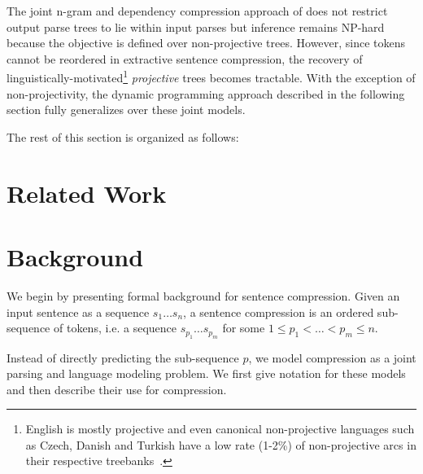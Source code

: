 \documentclass[11pt,a4paper]{article}
\begin{document}
The joint n-gram and dependency compression approach of
 does not restrict output parse trees to lie
within input parses but inference remains NP-hard~\cite{thadani14}
because the objective is defined over non-projective trees.
However, since tokens cannot be reordered in extractive sentence
compression, the recovery of linguistically-motivated\footnote{English
    is mostly projective and even
    canonical non-projective languages such
    as Czech, Danish and Turkish have a low rate (1-2\%) of
    non-projective arcs in their respective treebanks~\cite{nivre05}.}
\emph{projective} trees becomes tractable. With the exception of
non-projectivity, the dynamic programming approach described in
the following section fully generalizes over these joint models.

The rest of this section is organized as follows:



\section{Related Work}


\cite{eisner99dp}

\cite{huang2005machine}

\section{Background}
We begin by presenting formal background for sentence compression. Given an input sentence as a sequence $s_1 \ldots s_n$, a sentence compression is an ordered sub-sequence of tokens, i.e. a sequence $s_{p_1} \ldots s_{p_m}$ for some
$1 \leq p_1 < \ldots < p_m \leq n$. 

Instead of directly predicting the sub-sequence $p$, we model compression as a joint parsing and language modeling problem. We first give notation for these models and then describe their use for compression.



\end{document}
